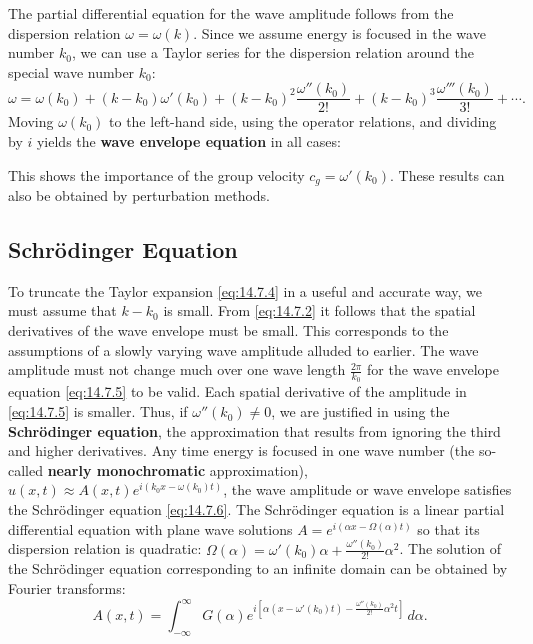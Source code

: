 The partial differential equation for the wave amplitude follows from the dispersion relation $\omega = \omega(k)$.  Since we assume energy is focused in the wave number $k_0$, we can use a Taylor series for the dispersion relation around the special wave number $k_0$:
\begin{equation}
\label{eq:14.7.4}
\omega = \omega(k_0) + (k - k_0)\omega'(k_0) + (k - k_0)^2\frac{\omega''(k_0)}{2!} + (k - k_0)^3\frac{\omega'''(k_0)}{3!} + \cdots.
\end{equation}
Moving $\omega(k_0)$ to the left-hand side, using the operator relations, and dividing by $i$ yields the \textbf{wave envelope equation} in all cases:

This shows the importance of the group velocity $c_g = \omega'(k_0)$.  These results can also be obtained by perturbation methods.

\subsection{Schr\"odinger Equation}
\label{sec:schrodinger}

To truncate the Taylor expansion \eqref{eq:14.7.4} in a useful and accurate way, we must assume that $k - k_0$ is small.  From \eqref{eq:14.7.2} it follows that the spatial derivatives of the wave envelope must be small.  This corresponds to the assumptions of a slowly varying wave amplitude alluded to earlier.  The wave amplitude must not change much over one wave length $\frac{2\pi}{k_0}$ for the wave envelope equation \eqref{eq:14.7.5} to be valid.  Each spatial derivative of the amplitude in \eqref{eq:14.7.5} is smaller.  Thus, if $\omega''(k_0) \neq 0$, we are justified in using the \textbf{Schr\"odinger equation},
the approximation that results from ignoring the third and higher derivatives.  Any time energy is focused in one wave number (the so-called \textbf{nearly monochromatic} approximation), $u(x,t) \approx A(x,t)e^{i(k_0 x - \omega(k_0)t)}$, the wave amplitude or wave envelope satisfies the Schr\"odinger equation \eqref{eq:14.7.6}.  The Schr\"odinger equation is a linear partial differential equation with plane wave solutions $A = e^{i(\alpha x - \Omega(\alpha)t)}$ so that its dispersion relation is quadratic: $\Omega(\alpha) = \omega'(k_0)\alpha + \frac{\omega''(k_0)}{2!}\alpha^2$.  The solution of the Schr\"odinger equation corresponding to an infinite domain can be obtained by Fourier transforms:
\begin{equation}
\label{eq:14.7.7}
A(x,t) = \int_{-\infty}^{\infty} G(\alpha)e^{i[\alpha(x - \omega'(k_0)t) - \frac{\omega''(k_0)}{2!}\alpha^2 t]}\,d\alpha.
\end{equation}

